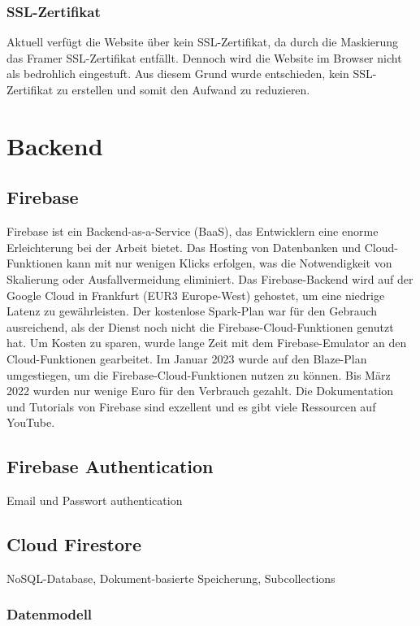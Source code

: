 \subsubsection{SSL-Zertifikat}
Aktuell verfügt die Website über kein SSL-Zertifikat, da durch die Maskierung das Framer SSL-Zertifikat entfällt. Dennoch wird die Website im Browser nicht als bedrohlich eingestuft. Aus diesem Grund wurde entschieden, kein SSL-Zertifikat zu erstellen und somit den Aufwand zu reduzieren.

\section{Backend}

\subsection{Firebase}
Firebase ist ein Backend-as-a-Service (BaaS), das Entwicklern eine enorme Erleichterung bei der Arbeit bietet. Das Hosting von Datenbanken und Cloud-Funktionen kann mit nur wenigen Klicks erfolgen, was die Notwendigkeit von Skalierung oder Ausfallvermeidung eliminiert. Das Firebase-Backend wird auf der Google Cloud in Frankfurt (EUR3 Europe-West) gehostet, um eine niedrige Latenz zu gewährleisten. Der kostenlose Spark-Plan war für den Gebrauch ausreichend, als der Dienst noch nicht die Firebase-Cloud-Funktionen genutzt hat. Um Kosten zu sparen, wurde lange Zeit mit dem Firebase-Emulator an den Cloud-Funktionen gearbeitet. Im Januar 2023 wurde auf den Blaze-Plan umgestiegen, um die Firebase-Cloud-Funktionen nutzen zu können. Bis März 2022 wurden nur wenige Euro für den Verbrauch gezahlt. Die Dokumentation und Tutorials von Firebase sind exzellent und es gibt viele Ressourcen auf YouTube.

\subsection{Firebase Authentication}
Email und Passwort authentication

\subsection{Cloud Firestore}
NoSQL-Database, Dokument-basierte Speicherung, Subcollections

\subsubsection{Datenmodell}

